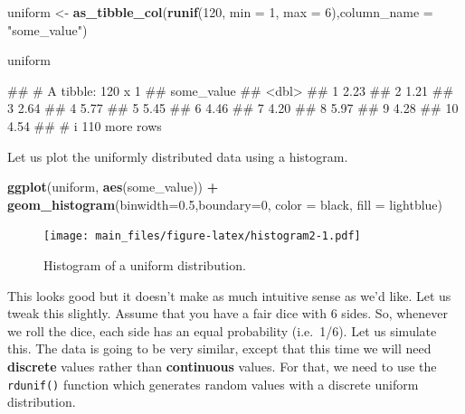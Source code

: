\documentclass[
]{book}
\newenvironment{Shaded}{\begin{snugshade}}{\end{snugshade}}
\newcommand{\AttributeTok}[1]{\textcolor[rgb]{0.13,0.29,0.53}{#1}}
\newcommand{\DecValTok}[1]{\textcolor[rgb]{0.00,0.00,0.81}{#1}}
\newcommand{\FloatTok}[1]{\textcolor[rgb]{0.00,0.00,0.81}{#1}}
\newcommand{\FunctionTok}[1]{\textcolor[rgb]{0.13,0.29,0.53}{\textbf{#1}}}
\newcommand{\NormalTok}[1]{#1}
\newcommand{\OtherTok}[1]{\textcolor[rgb]{0.56,0.35,0.01}{#1}}
\newcommand{\SpecialCharTok}[1]{\textcolor[rgb]{0.81,0.36,0.00}{\textbf{#1}}}
\newcommand{\StringTok}[1]{\textcolor[rgb]{0.31,0.60,0.02}{#1}}
\begin{document}
\begin{Shaded}
\begin{Highlighting}[]
\NormalTok{uniform }\OtherTok{\textless{}{-}} \FunctionTok{as\_tibble\_col}\NormalTok{(}\FunctionTok{runif}\NormalTok{(}\DecValTok{120}\NormalTok{, }\AttributeTok{min =} \DecValTok{1}\NormalTok{, }\AttributeTok{max =} \DecValTok{6}\NormalTok{),}\AttributeTok{column\_name =} \StringTok{"some\_value"}\NormalTok{)}

\NormalTok{uniform}
\end{Highlighting}
\end{Shaded}

\begin{Shaded}
\begin{Highlighting}[]
\NormalTok{\#\# \# A tibble: 120 x 1}
\NormalTok{\#\#    some\_value}
\NormalTok{\#\#         \textless{}dbl\textgreater{}}
\NormalTok{\#\#  1       2.23}
\NormalTok{\#\#  2       1.21}
\NormalTok{\#\#  3       2.64}
\NormalTok{\#\#  4       5.77}
\NormalTok{\#\#  5       5.45}
\NormalTok{\#\#  6       4.46}
\NormalTok{\#\#  7       4.20}
\NormalTok{\#\#  8       5.97}
\NormalTok{\#\#  9       4.28}
\NormalTok{\#\# 10       4.54}
\NormalTok{\#\# \# i 110 more rows}
\end{Highlighting}
\end{Shaded}

Let us plot the uniformly distributed data using a histogram.

\begin{Shaded}
\begin{Highlighting}[]
\FunctionTok{ggplot}\NormalTok{(uniform, }\FunctionTok{aes}\NormalTok{(some\_value)) }\SpecialCharTok{+}
        \FunctionTok{geom\_histogram}\NormalTok{(}\AttributeTok{binwidth=}\FloatTok{0.5}\NormalTok{,}\AttributeTok{boundary=}\DecValTok{0}\NormalTok{,}
                       \AttributeTok{color =} \StringTok{\textquotesingle{}black\textquotesingle{}}\NormalTok{,}
                       \AttributeTok{fill =} \StringTok{\textquotesingle{}lightblue\textquotesingle{}}\NormalTok{)}
\end{Highlighting}
\end{Shaded}

\begin{figure}
\centering
\texttt{[image: main\_files/figure-latex/histogram2-1.pdf]}
\caption{\label{fig:histogram2}Histogram of a uniform distribution.}
\end{figure}

This looks good but it doesn't make as much intuitive sense as we'd like. Let us tweak this slightly. Assume that you have a fair dice with 6 sides. So, whenever we roll the dice, each side has an equal probability (i.e.~1/6). Let us simulate this. The data is going to be very similar, except that this time we will need \textbf{discrete} values rather than \textbf{continuous} values. For that, we need to use the \texttt{rdunif()} function which generates random values with a discrete uniform distribution.
\end{document}
